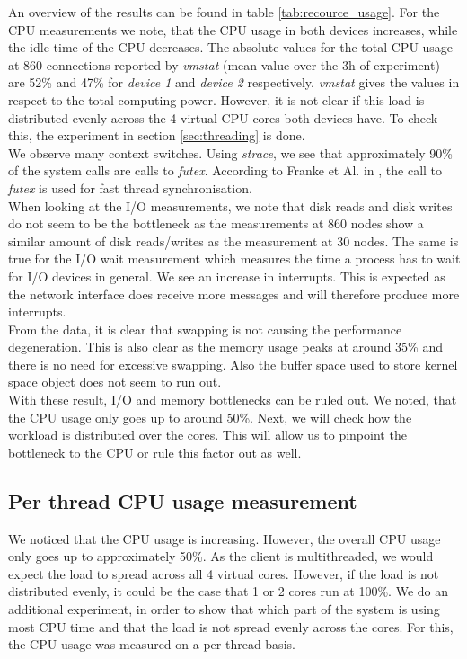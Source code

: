 An overview of the results can be found in table \ref{tab:recource_usage}. For the CPU measurements we note, that the CPU usage in both devices increases, while the idle time of the CPU decreases. The absolute values for the total CPU usage at 860 connections reported by \textit{vmstat} (mean value over the 3h of experiment) are 52\% and 47\% for \textit{device 1} and \textit{device 2} respectively. \textit{vmstat} gives the values in respect to the total computing power. However, it is not clear if this load is distributed evenly across the 4 virtual CPU cores both devices have. To check this, the experiment in section \ref{sec:threading} is done. \\
 We observe many context switches. Using \textit{strace}, we see that approximately 90\% of the system calls are calls to \textit{futex}. According to Franke et Al. in \cite{franke2002fuss}, the call to \textit{futex} is used for fast thread synchronisation.\\
 When looking at the I/O measurements, we note that disk reads and disk writes do not seem to be the bottleneck as the measurements at 860 nodes show a similar amount of disk reads/writes as the measurement at 30 nodes. The same is true for the I/O wait measurement which measures the time a process has to wait for I/O devices in general. We see an increase in interrupts. This is expected as the network interface does receive more messages and will therefore produce more interrupts.\\
 From the data, it is clear that swapping is not causing the performance degeneration. This is also clear as the memory usage peaks at around 35\% and there is no need for excessive swapping. Also the buffer space used to store kernel space object does not seem to run out.\\
 With these result, I/O and memory bottlenecks can be ruled out. We noted, that the CPU usage only goes up to around 50\%. Next, we will check how the workload is distributed over the cores. This will allow us to pinpoint the bottleneck to the CPU or rule this factor out as well.










\subsection{Per thread CPU usage measurement \label{sec:threading}}
We noticed that the CPU usage is increasing. However, the overall CPU usage only goes up to approximately 50\%. As the client is multithreaded, we would expect the load to spread across all 4 virtual cores. However, if the load is not distributed evenly, it could be the case that 1 or 2 cores run at 100\%. We do an additional experiment, in order to show that which part of the system is using most CPU time and that the load is not spread evenly across the cores. For this, the CPU usage was measured on a per-thread basis.\\

